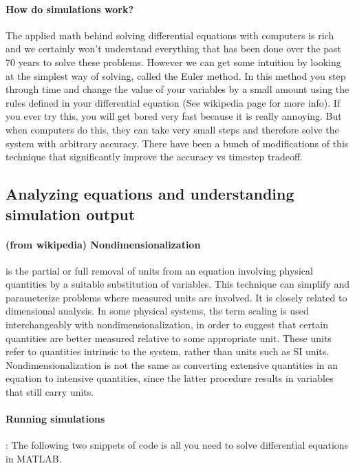 \paragraph{How do simulations work?} The applied math behind solving differential equations with computers is rich and we certainly won't understand everything that has been done over the past 70 years to solve these problems.  However we can get some intuition by looking at the simplest way of solving, called the Euler method.  In this method you step through time and change the value of your variables by a small amount using the rules defined in your differential equation (See wikipedia page for more info).  If you ever try this, you will get bored very fast because it is really annoying.  But when computers do this, they can take very small steps and therefore solve the system with arbitrary accuracy.  There have been a bunch of modifications of this technique that significantly improve the accuracy vs timestep tradeoff.


% 



\subsection{Analyzing equations and understanding simulation output}

\paragraph{(from wikipedia) Nondimensionalization} is the partial or full removal of units from an equation involving physical quantities by a suitable substitution of variables. This technique can simplify and parameterize problems where measured units are involved. It is closely related to dimensional analysis. In some physical systems, the term scaling is used interchangeably with nondimensionalization, in order to suggest that certain quantities are better measured relative to some appropriate unit. These units refer to quantities intrinsic to the system, rather than units such as SI units. Nondimensionalization is not the same as converting extensive quantities in an equation to intensive quantities, since the latter procedure results in variables that still carry units.

\paragraph{Running simulations}: The following two snippets of code is all you need to solve differential equations in MATLAB.


